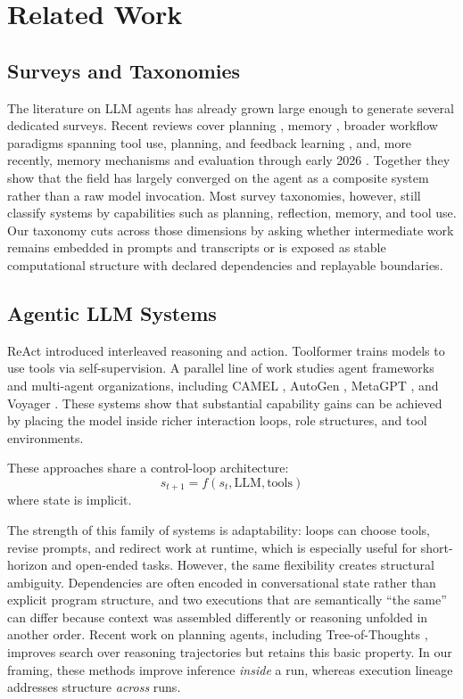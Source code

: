 \documentclass{article}
\begin{document}
\section{Related Work}

\subsection{Surveys and Taxonomies}

The literature on LLM agents has already grown large enough to generate several dedicated surveys. Recent reviews cover planning \cite{huang2024planning}, memory \cite{zhang2024memorysurvey}, broader workflow paradigms spanning tool use, planning, and feedback learning \cite{li2024review}, and, more recently, memory mechanisms and evaluation through early 2026 \cite{du2026memorysurvey}. Together they show that the field has largely converged on the agent as a composite system rather than a raw model invocation. Most survey taxonomies, however, still classify systems by capabilities such as planning, reflection, memory, and tool use. Our taxonomy cuts across those dimensions by asking whether intermediate work remains embedded in prompts and transcripts or is exposed as stable computational structure with declared dependencies and replayable boundaries.

\subsection{Agentic LLM Systems}

ReAct \cite{yao2023react} introduced interleaved reasoning and action. Toolformer \cite{schick2023toolformer} trains models to use tools via self-supervision. A parallel line of work studies agent frameworks and multi-agent organizations, including CAMEL \cite{li2023camel}, AutoGen \cite{wu2023autogen}, MetaGPT \cite{hong2023metagpt}, and Voyager \cite{wang2023voyager}. These systems show that substantial capability gains can be achieved by placing the model inside richer interaction loops, role structures, and tool environments.

These approaches share a control-loop architecture:
\begin{equation}
s_{t+1} = f(s_t, \text{LLM}, \text{tools})
\end{equation}
where state is implicit.

The strength of this family of systems is adaptability: loops can choose tools, revise prompts, and redirect work at runtime, which is especially useful for short-horizon and open-ended tasks. However, the same flexibility creates structural ambiguity. Dependencies are often encoded in conversational state rather than explicit program structure, and two executions that are semantically ``the same'' can differ because context was assembled differently or reasoning unfolded in another order. Recent work on planning agents, including Tree-of-Thoughts \cite{yao2023tree}, improves search over reasoning trajectories but retains this basic property. In our framing, these methods improve inference \emph{inside} a run, whereas execution lineage addresses structure \emph{across} runs.
\end{document}
